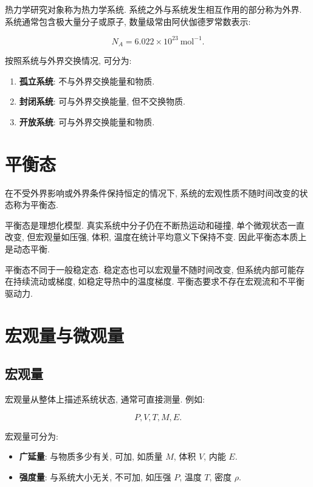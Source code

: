 \documentclass[
  a4paper,
]{ctexrep}
\providecommand{\tightlist}{%
  \setlength{\itemsep}{0pt}\setlength{\parskip}{0pt}}
\begin{document}
热力学研究对象称为热力学系统. 系统之外与系统发生相互作用的部分称为外界.
系统通常包含极大量分子或原子, 数量级常由阿伏伽德罗常数表示:

\[
N_A=6.022\times 10^{23}\ \mathrm{mol^{-1}}.
\]

按照系统与外界交换情况, 可分为:

\begin{enumerate}
\def\labelenumi{\arabic{enumi}.}
\tightlist
\item
  \textbf{孤立系统}: 不与外界交换能量和物质.
\item
  \textbf{封闭系统}: 可与外界交换能量, 但不交换物质.
\item
  \textbf{开放系统}: 可与外界交换能量和物质.
\end{enumerate}

\section{平衡态}\label{ux5e73ux8861ux6001}

在不受外界影响或外界条件保持恒定的情况下,
系统的宏观性质不随时间改变的状态称为平衡态.

平衡态是理想化模型. 真实系统中分子仍在不断热运动和碰撞,
单个微观状态一直改变, 但宏观量如压强, 体积,
温度在统计平均意义下保持不变. 因此平衡态本质上是动态平衡.

平衡态不同于一般稳定态. 稳定态也可以宏观量不随时间改变,
但系统内部可能存在持续流动或梯度, 如稳定导热中的温度梯度.
平衡态要求不存在宏观流和不平衡驱动力.

\section{宏观量与微观量}\label{ux5b8fux89c2ux91cfux4e0eux5faeux89c2ux91cf}

\subsection{宏观量}\label{ux5b8fux89c2ux91cf}

宏观量从整体上描述系统状态, 通常可直接测量. 例如:

\[
P,V,T,M,E.
\]

宏观量可分为:

\begin{itemize}
\tightlist
\item
  \textbf{广延量}: 与物质多少有关, 可加, 如质量 \(M\), 体积 \(V\), 内能
  \(E\).
\item
  \textbf{强度量}: 与系统大小无关, 不可加, 如压强 \(P\), 温度 \(T\),
  密度 \(\rho\).
\end{itemize}
\end{document}
